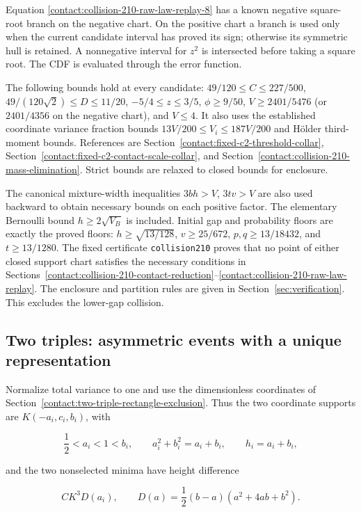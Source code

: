 Equation \eqref{contact:collision-210-raw-law-replay-8} has a known negative square-root branch on the negative chart. On the positive chart a branch is used only when the
current candidate interval has proved its sign; otherwise its symmetric
hull is retained. A nonnegative interval for $z^2$ is intersected before
taking a square root. The CDF is evaluated through the error function.

The following bounds hold at every candidate:
$49/120\le C\le 227/500$, $49/(120 \sqrt{2})\le D\le 11/20$,
$-5/4\le z\le 3/5$, $\phi\ge 9/50$,
$V\ge 2401/5476$ (or $2401/4356$ on the negative chart), and $V\le 4$.
It also uses the established coordinate variance fraction bounds
$13V/200\le V_i\le 187V/200$ and H\"older third-moment bounds. References are
Section~\ref{contact:fixed-c2-threshold-collar},
Section~\ref{contact:fixed-c2-contact-scale-collar}, and
Section~\ref{contact:collision-210-mass-elimination}.
Strict bounds are relaxed to closed bounds for enclosure.

The canonical mixture-width inequalities $3bh>V$, $3tv>V$ are also used
backward to obtain necessary bounds on each positive factor. The elementary
Bernoulli bound $h\ge 2 \sqrt{V_B}$ is included. Initial gap and probability
floors are exactly the proved floors: $h\ge \sqrt{13/128}$,
$v\ge 25/672$, $p,q\ge 13/18432$, and $t\ge 13/1280$.
The fixed certificate \texttt{collision210} proves that no point of
either closed support chart satisfies the necessary conditions in
Sections~\ref{contact:collision-210-contact-reduction}--\ref{contact:collision-210-raw-law-replay}.
The enclosure and partition rules are given in Section~\ref{sec:verification}.
This excludes the lower-gap collision.

\subsection{Two triples: asymmetric events with a unique representation}\label{contact:two-triple-asymmetric-exclusion}



Normalize total variance to one and use the dimensionless coordinates of
Section~\ref{contact:two-triple-rectangle-exclusion}. Thus the two coordinate supports are $K(-a_i,c_i,b_i)$, with

\[
 \frac12<a_i<1<b_i,\qquad a_i^2+b_i^2=a_i+b_i,
 \qquad h_i=a_i+b_i,
\]

and the two nonselected minima have height difference

\[
 C K^3D(a_i),\qquad
 D(a)=\frac12(b-a)(a^2+4ab+b^2).
\]

